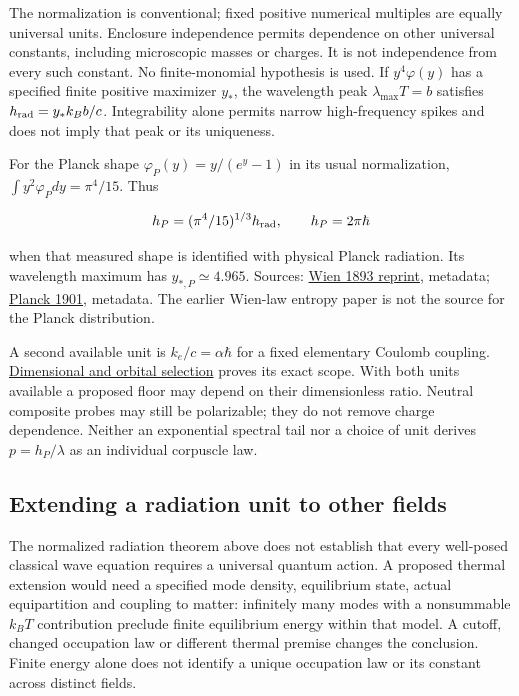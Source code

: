 \documentclass[11pt,a4paper]{article}
\begin{document}
The normalization is conventional; fixed positive numerical multiples
are equally universal units. Enclosure independence permits dependence
on other universal constants, including microscopic masses or charges.
It is not independence from every such constant. No finite-monomial
hypothesis is used. If \(y^4\varphi(y)\) has a specified finite positive
maximizer \(y_*\), the wavelength peak \(\lambda_{\max}T=b\) satisfies
\(h_{\rm rad}=y_*k_Bb/c\). Integrability alone permits narrow
high-frequency spikes and does not imply that peak or its uniqueness.

For the Planck shape \(\varphi_P(y)=y/(e^y-1)\) in its usual
normalization, \(\int y^2\varphi_Pdy=\pi^4/15\). Thus

\[h_P=(\pi^4/15)^{1/3}h_{\rm rad},\qquad h_P=2\pi\hbar\]

when that measured shape is identified with physical Planck radiation.
Its wavelength maximum has \(y_{*,P}\simeq4.965\). Sources:
\href{https://doi.org/10.1007/978-3-663-13885-3_12}{Wien 1893 reprint},
metadata; \href{https://doi.org/10.1002/andp.19013090310}{Planck 1901},
metadata. The earlier Wien-law entropy paper is not the source for the
Planck distribution.

A second available unit is \(k_e/c=\alpha\hbar\) for a fixed elementary
Coulomb coupling.
\href{action-unit-dimensional-selection.md}{Dimensional and orbital
selection} proves its exact scope. With both units available a proposed
floor may depend on their dimensionless ratio. Neutral composite probes
may still be polarizable; they do not remove charge dependence. Neither
an exponential spectral tail nor a choice of unit derives
\(p=h_P/\lambda\) as an individual corpuscle law.

\hypertarget{extending-a-radiation-unit-to-other-fields}{%
\subsection{Extending a radiation unit to other
fields}\label{extending-a-radiation-unit-to-other-fields}}

The normalized radiation theorem above does not establish that every
well-posed classical wave equation requires a universal quantum action.
A proposed thermal extension would need a specified mode density,
equilibrium state, actual equipartition and coupling to matter:
infinitely many modes with a nonsummable \(k_BT\) contribution preclude
finite equilibrium energy within that model. A cutoff, changed
occupation law or different thermal premise changes the conclusion.
Finite energy alone does not identify a unique occupation law or its
constant across distinct fields.
\end{document}
